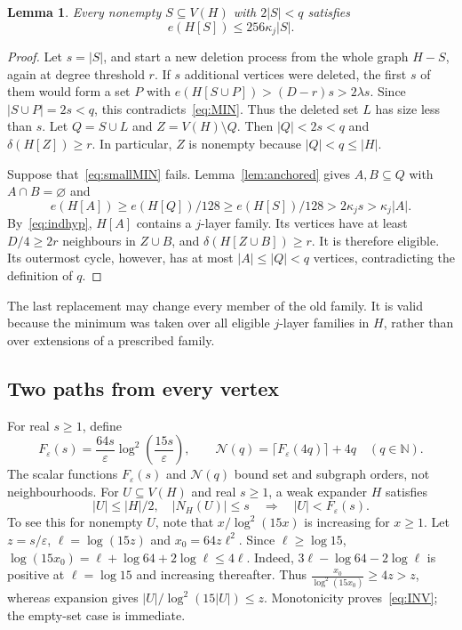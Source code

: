 \documentclass[10pt,letterpaper]{article}
\newtheorem{lemma}[theorem]{Lemma}
\theoremstyle{definition}
\theoremstyle{remark}
\newcommand{\eps}{\varepsilon}
\begin{document}
\begin{lemma}\label{lem:smallsets}
Every nonempty $S\subseteq V(H)$ with $2|S|<q$ satisfies
\begin{equation}\label{eq:smallMIN}
e(H[S])\le256\kappa_j|S|.
\end{equation}
\end{lemma}
\begin{proof}
Let $s=|S|$, and start a new deletion process from the whole graph $H-S$, again at degree threshold $r$. If $s$ additional vertices were deleted, the first $s$ of them would form a set $P$ with $e(H[S\cup P])>(D-r)s>2\lambda s$. Since $|S\cup P|=2s<q$, this contradicts~\eqref{eq:MIN}. Thus the deleted set $L$ has size less than $s$. Let $Q=S\cup L$ and $Z=V(H)\setminus Q$. Then $|Q|<2s<q$ and $\delta(H[Z])\ge r$. In particular, $Z$ is nonempty because $|Q|<q\le|H|$.

Suppose that~\eqref{eq:smallMIN} fails. Lemma~\ref{lem:anchored} gives $A,B\subseteq Q$ with $A\cap B=\varnothing$ and
\[
e(H[A])\ge e(H[Q])/128
\ge e(H[S])/128>2\kappa_js>\kappa_j|A|.
\]
By~\eqref{eq:indhyp}, $H[A]$ contains a $j$-layer family. Its vertices have at least $D/4\ge2r$ neighbours in $Z\cup B$, and $\delta(H[Z\cup B])\ge r$. It is therefore eligible. Its outermost cycle, however, has at most $|A|\le|Q|<q$ vertices, contradicting the definition of $q$.
\end{proof}

The last replacement may change every member of the old family. It is valid because the minimum was taken over all eligible $j$-layer families in $H$, rather than over extensions of a prescribed family.

\subsection{Two paths from every vertex}

For real $s\ge1$, define
\[
F_\eps(s)=\frac{64s}{\eps}\log^2\!\left(\frac{15s}{\eps}\right),
\qquad
\mathcal N(q)=\lceil F_\eps(4q)\rceil+4q\quad(q\in\mathbb N).
\]
The scalar functions $F_\eps(s)$ and $\mathcal N(q)$ bound set and subgraph orders, not neighbourhoods. For $U\subseteq V(H)$ and real $s\ge1$, a weak expander $H$ satisfies
\begin{equation}\label{eq:INV}
|U|\le|H|/2,\quad |N_H(U)|\le s
\quad\Longrightarrow\quad |U|<F_\eps(s).
\end{equation}
To see this for nonempty $U$, note that $x/\log^2(15x)$ is increasing for $x\ge1$. Let $z=s/\eps$, $\ell=\log(15z)$ and $x_0=64z\ell^2$. Since $\ell\ge\log15$, $\log(15x_0)=\ell+\log64+2\log\ell\le4\ell$. Indeed, $3\ell-\log64-2\log\ell$ is positive at $\ell=\log15$ and increasing thereafter. Thus $\frac{x_0}{\log^2(15x_0)}\ge4z>z$, whereas expansion gives $|U|/\log^2(15|U|)\le z$. Monotonicity proves~\eqref{eq:INV}; the empty-set case is immediate.
\end{document}
